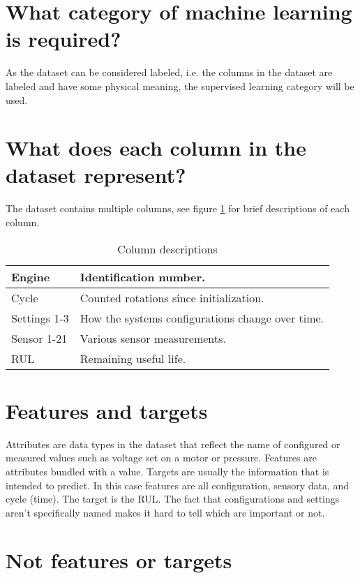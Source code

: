 \documentclass[%
oneside,    %
project,    %
nosummary   %
]{USN-MSc}
\begin{document}
\section{What category of machine learning is required?}
\label{sec:mlCategory}
As the dataset can be considered labeled, i.e. the columns in the dataset are labeled and have some physical meaning, the supervised learning category will be used.

\section{What does each column in the dataset represent?}
\label{sec:datasetColumns}
The dataset contains multiple columns, see figure \ref{tab:columnDescr} for brief descriptions of each column.

\begin{table}[!ht]
  \caption{Column descriptions}
  \centering
  \begin{tabular}{ | m{3cm} | m{10cm} |}
    \hline
    Engine       & Identification number.                           \\ \hline
    Cycle        & Counted rotations since initialization.          \\ \hline
    Settings 1-3 & How the systems configurations change over time. \\ \hline
    Sensor 1-21  & Various sensor measurements.                     \\ \hline
    RUL          & Remaining useful life.                           \\ \hline
  \end{tabular}
  \label{tab:columnDescr}
\end{table}

\section{Features and targets}
\label{sec:featuresTargets}
Attributes are data types in the dataset that reflect the name of configured or measured values such as voltage set on a motor or pressure. Features are attributes bundled with a value. Targets are usually the information that is intended to predict. In this case features are all configuration, sensory data, and cycle (time). The target is the RUL. The fact that configurations and settings aren't specifically named makes it hard to tell which are important or not.

\section{Not features or targets}
\label{sec:notFeaturesTargets}
\end{document}
